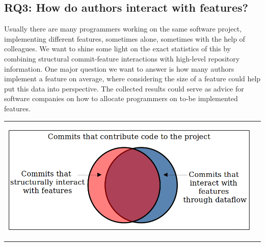 \subsection*{\textbf{RQ3: How do authors interact with features?}}

Usually there are many programmers working on the same software project, implementing different features, sometimes alone, sometimes with the help of colleagues.
We want to shine some light on the exact statistics of this by combining structural commit-feature interactions with high-level repository information.
One major question we want to answer is how many authors implement a feature on average, where considering the size of a feature could help put this data into perspective.
The collected results could serve as advice for software companies on how to allocate programmers on to-be implemented features. 

\begin{center}
\begin{tabular}{cc}
\includegraphics[height=6cm]{gfx/Commits-of-a-Software-Project.png}
\end{tabular}
\end{center}
